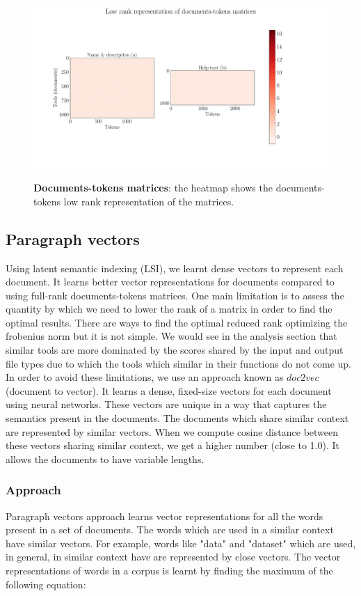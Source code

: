 \begin{figure}[h]
\begin{centering}
    {\includegraphics[scale=0.33]{figures/Document_tokens_low_rank.pdf}}
    \caption[Documents-tokens matrices]{\textbf{Documents-tokens matrices}: the heatmap shows the documents-tokens low rank representation of the matrices.}
\end{centering}
\end{figure}

\subsection{Paragraph vectors}
Using latent semantic indexing (LSI), we learnt dense vectors to represent each document. It learns better vector representations for documents compared to using full-rank documents-tokens matrices. One main limitation is to assess the quantity by which we need to lower the rank of a matrix in order to find the optimal results. There are ways to find the optimal reduced rank optimizing the frobenius norm but it is not simple. We would see in the analysis section that similar tools are more dominated by the scores shared by the input and output file types due to which the tools which similar in their functions do not come up. In order to avoid these limitations, we use an approach known as $doc2vec$ (document to vector). It learns a dense, fixed-size vectors for each document using neural networks. These vectors are unique in a way that captures the semantics present in the documents. The documents which share similar context are represented by similar vectors. When we compute cosine distance between these vectors sharing similar context, we get a higher number (close to 1.0). It allows the documents to have variable lengths.

\subsubsection{Approach}
Paragraph vectors approach learns vector representations for all the words present in a set of documents. The words which are used in a similar context have similar vectors. For example, words like "data" and "dataset" which are used, in general, in similar context have are represented by close vectors. The vector representations of words in a corpus is learnt by finding the maximum of the following equation:

